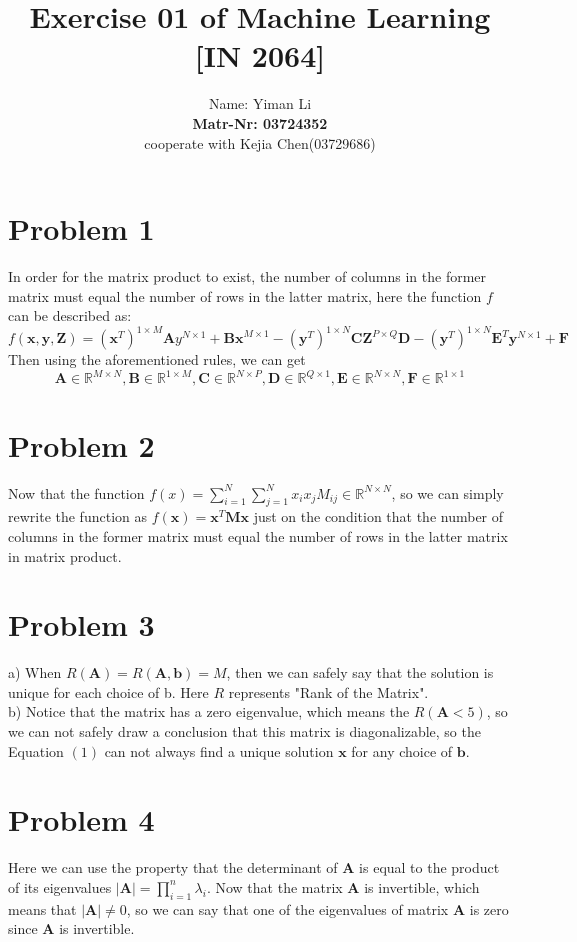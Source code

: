 \documentclass{article}
\title{Exercise 01 of Machine Learning [IN 2064]}
\author{
  Name: Yiman Li \\
  \textbf{Matr-Nr: 03724352} \\
  cooperate with Kejia Chen(03729686)\\
}
\begin{document}
\maketitle

\section*{Problem 1}
In order for the matrix product to exist, the number of columns in the former matrix must equal the number of rows in the latter matrix, here the function $f$ can be described as:
\[ f(\bm{x,y,Z}) = (\bm{x}^T)^{1 \times M}\bm{A}y^{N \times 1} + \bm{Bx}^{M \times 1} - (\bm{y}^T)^{1 \times N}\bm{CZ}^{P \times Q}\bm{D} - (\bm{y}^T)^{1 \times N}\bm{E}^T\bm{y}^{N \times 1} + \bm{F} \]
Then using the aforementioned rules, we can get
\[\bm{A} \in \mathbb{R}^{M \times N}, \bm{B} \in \mathbb{R}^{1 \times M}, \bm{C} \in \mathbb{R}^{N \times P}, \bm{D} \in \mathbb{R}^{Q \times 1}, \bm{E} \in \mathbb{R}^{N \times N}, \bm{F} \in \mathbb{R}^{1 \times 1}\]

\section*{Problem 2}
Now that the function $ f(x) = \sum_{i=1}^N\sum_{j=1}^{N}x_ix_jM_{ij}  \in \mathbb{R}^{N\times N} $, so we can simply rewrite the function as $ f(\bm{x}) = \bm{x}^T\bm{Mx} $ just on the condition that the number of columns in the former matrix must equal the number of rows in the latter matrix in matrix product.

\section*{Problem 3}
a) When $ R(\bm{A})=R(\bm{A,b})=M $, then we can safely say that the solution is unique for each choice of b. Here $R$ represents "Rank of the Matrix".\\
b) Notice that the matrix has a zero eigenvalue, which means the $ R(\bm{A} < 5)$, so we can not safely draw a conclusion that this matrix is diagonalizable, so the Equation $(1)$ can not always find a unique solution $ \bm{x} $ for any choice of $ \bm{b} $.

\section*{Problem 4}
Here we can use the property that the determinant of $\bm{A}$ is equal to the product of its eigenvalues $|\bm{A}|=\prod_{i=1}^{n} \lambda_i$. Now that the matrix $\bm{A}$ is invertible, which means that $|\bm{A}|\not = 0$, so we can say that one of the eigenvalues of matrix $\bm{A}$ is zero since $\bm{A}$ is invertible.
\end{document}
